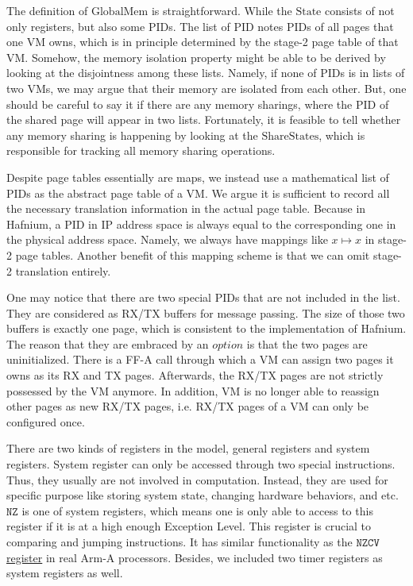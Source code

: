 \documentclass[a4paper]{article}
\newcommand*{\STATE}{\text{State}}
\newcommand*{\MEM}{\text{GlobalMem}}
\newcommand*{\SSS}{\text{ShareStates}}
\newcommand*{\PID}{\text{PID}}
\begin{document}
The definition of $\MEM$ is straightforward. While the $\STATE$ consists of not
only registers, but also some $\PID$s.
The list of $\PID$ notes $\PID$s of all
pages that one VM owns, which is in principle determined by the stage-2 page
table of that VM.
Somehow, the memory isolation property might be able to be derived
by looking at the disjointness among these lists. Namely, if none of $\PID$s is in
lists of two VMs, we may argue that their memory are isolated from each other.
But, one should be careful to say it if there are any memory sharings, where the $\PID$
of the shared page will appear in two lists. Fortunately, it is feasible to tell
whether any memory sharing is happening by looking at the $\SSS$, which is responsible
for tracking all memory sharing operations.

Despite page tables essentially are maps, we instead use a mathematical list of
$\PID$s as the abstract page table of a VM.
We argue it is sufficient to record all the necessary translation
information in the actual page table. Because in Hafnium, a $\PID$ in IP address
space is always equal to the corresponding one in the physical address space.
Namely, we always have mappings like $x \mapsto x$ in stage-2 page tables.
Another benefit of this mapping scheme is that we can omit stage-2 translation entirely.

One may notice that there are two special $\PID$s that are not included in the
list. They are considered as RX/TX buffers for message passing. The size of
those two buffers is exactly one page, which is consistent to the
implementation of Hafnium. The reason that they are embraced by an $option$ is
that the two pages are uninitialized. There is a FF-A call through which a VM
can assign two pages it owns as its RX and TX pages. Afterwards, the RX/TX pages
are not strictly possessed by the VM anymore. In addition, VM is no longer able to
reassign other pages as new RX/TX pages, i.e. RX/TX pages of a VM can only be
configured once.

There are two kinds of registers in the model, general registers and system registers.
System register can only be accessed through two special instructions. Thus, they usually are not involved in computation. Instead, they are used for specific purpose like storing system state, changing hardware behaviors, and etc.
 $\mathtt{NZ}$ is one of system registers, which means one
is only able to access to this register if it is at a high enough Exception
Level. This register is crucial to comparing and jumping instructions. It has
similar functionality as the
\href{https://developer.arm.com/docs/ddi0595/h/aarch64-system-registers/nzcv}
{$\mathtt{NZCV}$ register} in real Arm-A processors. Besides, we included two timer registers as system registers as well.
\end{document}
